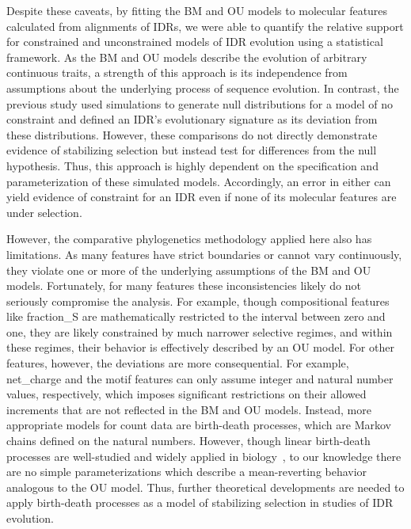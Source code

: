 Despite these caveats, by fitting the BM and OU models to molecular features calculated from alignments of IDRs, we were able to quantify the relative support for constrained and unconstrained models of IDR evolution using a statistical framework. As the BM and OU models describe the evolution of arbitrary continuous traits, a strength of this approach is its independence from assumptions about the underlying process of sequence evolution. In contrast, the previous study used simulations to generate null distributions for a model of no constraint and defined an IDR's evolutionary signature as its deviation from these distributions. However, these comparisons do not directly demonstrate evidence of stabilizing selection but instead test for differences from the null hypothesis. Thus, this approach is highly dependent on the specification and parameterization of these simulated models. Accordingly, an error in either can yield evidence of constraint for an IDR even if none of its molecular features are under selection.

However, the comparative phylogenetics methodology applied here also has limitations. As many features have strict boundaries or cannot vary continuously, they violate one or more of the underlying assumptions of the BM and OU models. Fortunately, for many features these inconsistencies likely do not seriously compromise the analysis. For example, though compositional features like fraction\_S are mathematically restricted to the interval between zero and one, they are likely constrained by much narrower selective regimes, and within these regimes, their behavior is effectively described by an OU model. For other features, however, the deviations are more consequential. For example, net\_charge and the motif features can only assume integer and natural number values, respectively, which imposes significant restrictions on their allowed increments that are not reflected in the BM and OU models. Instead, more appropriate models for count data are birth-death processes, which are Markov chains defined on the natural numbers. However, though linear birth-death processes are well-studied and widely applied in biology~\cite{Crawford2011}, to our knowledge there are no simple parameterizations which describe a mean-reverting behavior analogous to the OU model. Thus, further theoretical developments are needed to apply birth-death processes as a model of stabilizing selection in studies of IDR evolution.

